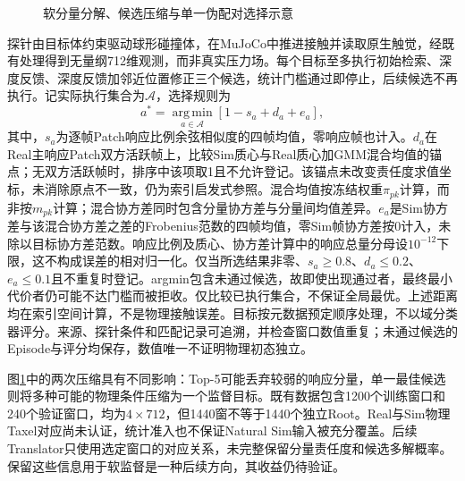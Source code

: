 \begin{figure}[htbp]
 \centering
 \caption{软分量分解、候选压缩与单一伪配对选择示意}
 \label{fig:ch05_gmm_candidate_selection}
\end{figure}

探针由目标体约束驱动球形碰撞体，在MuJoCo中推进接触并读取原生触觉，经既有处理得到无量纲712维观测，而非真实压力场。每个目标至多执行初始检索、深度反馈、深度反馈加邻近位置修正三个候选，统计门槛通过即停止，后续候选不再执行。记实际执行集合为$\mathcal A$，选择规则为
\begin{equation}
 a^*=\operatorname*{arg\,min}_{a\in\mathcal A}
 \left[1-s_a+d_a+e_a\right],
 \label{eq:ch05_pair_selection}
\end{equation}
其中，$s_a$为逐帧Patch响应比例余弦相似度的四帧均值，零响应帧也计入。$d_a$在Real主响应Patch双方活跃帧上，比较Sim质心与Real质心加GMM混合均值的锚点；无双方活跃帧时，排序中该项取1且不允许登记。该锚点未改变责任度求值坐标，未消除原点不一致，仍为索引启发式参照。混合均值按冻结权重$\pi_{pk}$计算，而非按$m_{pk}$计算；混合协方差同时包含分量协方差与分量间均值差异。$e_a$是Sim协方差与该混合协方差之差的Frobenius范数的四帧均值，零Sim帧协方差按0计入，未除以目标协方差范数。响应比例及质心、协方差计算中的响应总量分母设$10^{-12}$下限，这不构成误差的相对归一化。仅当所选结果非零、$s_a\ge0.8$、$d_a\le0.2$、$e_a\le0.1$且不重复时登记。argmin包含未通过候选，故即使出现通过者，最终最小代价者仍可能不达门槛而被拒收。仅比较已执行集合，不保证全局最优。上述距离均在索引空间计算，不是物理接触误差。目标按元数据预定顺序处理，不以域分类器评分。来源、探针条件和匹配记录可追溯，并检查窗口数值重复；未通过候选的Episode与评分均保存，数值唯一不证明物理初态独立。

图\ref{fig:ch05_gmm_candidate_selection}中的两次压缩具有不同影响：Top-5可能丢弃较弱的响应分量，单一最佳候选则将多种可能的物理条件压缩为一个监督目标。既有数据包含1200个训练窗口和240个验证窗口，均为$4\times712$，但1440窗不等于1440个独立Root。Real与Sim物理Taxel对应尚未认证，统计准入也不保证Natural Sim输入被充分覆盖。后续Translator只使用选定窗口的对应关系，未完整保留分量责任度和候选多解概率。保留这些信息用于软监督是一种后续方向，其收益仍待验证。

